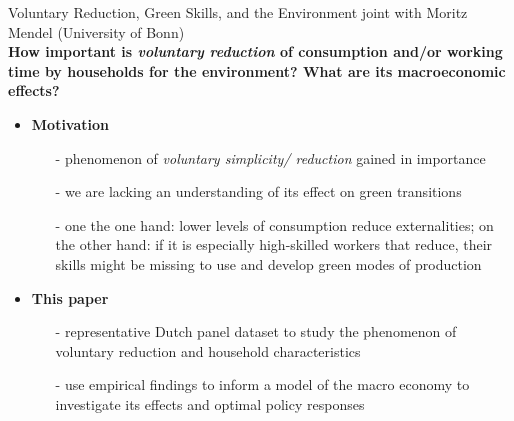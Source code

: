 \begin{frame}{Voluntary  Reduction, Green Skills, and the Environment}
		\vspace{-5mm}
	\hspace{-6mm}\footnotesize{joint with Moritz Mendel (University of Bonn)}\\
	
	
	\vspace{3mm}\textbf{\alert{How important is \textit{voluntary reduction} of consumption and/or working time by households for the environment? What are its macroeconomic effects? }}
	\pause
\begin{itemize}[<+->]
\item \textbf{Motivation}
\begin{itemize}
\item[-] phenomenon of \textit{voluntary simplicity/ reduction} gained in importance  \citep{Reboucas2021VoluntaryAgenda}%
\item[-] we are lacking an understanding of its effect on green transitions
\item[-] one the one hand: lower levels of consumption reduce externalities; on the other hand: if it is especially high-skilled workers that reduce, their skills might be missing to use and develop green modes of production \citep{Consoli2016DoCapital}
\end{itemize}
\item \textbf{This paper}
\begin{itemize}
	\item[-] representative Dutch panel dataset to study the phenomenon of voluntary reduction and household characteristics
	\item[-] use empirical findings to inform a model of the macro economy to investigate its effects and optimal policy responses
\end{itemize}
\end{itemize}
\end{frame}

